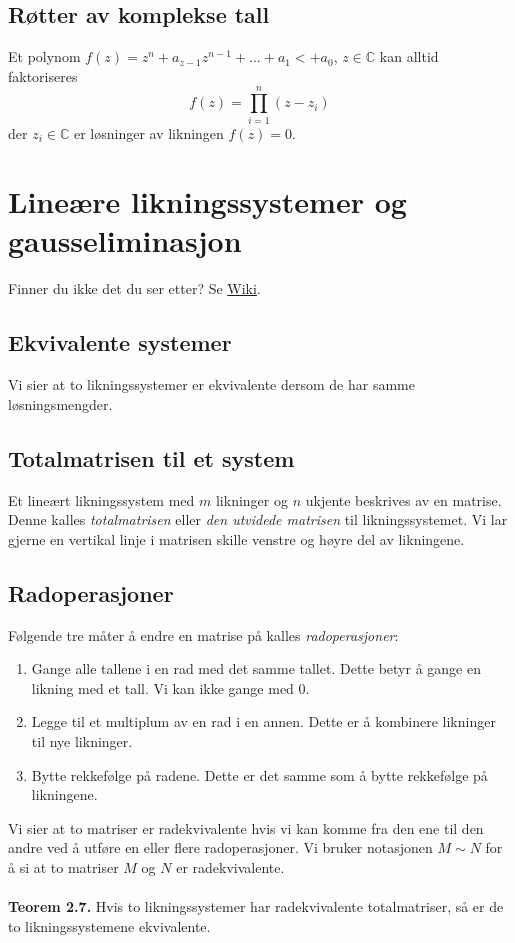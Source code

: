 \documentclass{article}
\begin{document}
\subsection{Røtter av komplekse tall}
Et polynom $f(z) = z^n + a_{z-1}z^{n-1} + ... + a_1<+a_0$, $z \in \mathbb{C}$ kan alltid faktoriseres
\[f(z) = \prod_{i=1}^n (z - z_i)\]
der $z_i \in \mathbb{C}$ er løsninger av likningen $f(z) = 0$.




\clearpage
\section{Lineære likningssystemer og gausseliminasjon}
Finner du ikke det du ser etter? Se \href{https://www.math.ntnu.no/emner/TMA4110/2020h/notater/2-lineare-likningssystemer.pdf}{Wiki}.


\subsection{Ekvivalente systemer}
Vi sier at to likningssystemer er ekvivalente dersom
de har samme løsningsmengder.


\subsection{Totalmatrisen til et system}
Et lineært likningssystem med $m$ likninger og $n$ ukjente beskrives av en matrise. Denne kalles \textit{totalmatrisen} eller \textit{den utvidede matrisen} til likningssystemet. Vi lar gjerne en vertikal linje i matrisen skille venstre og høyre del av likningene.


\subsection{Radoperasjoner}
Følgende tre måter å endre en matrise på kalles \textit{radoperasjoner}:
\begin{enumerate}
    \item Gange alle tallene i en rad med det samme tallet. Dette betyr å gange en likning med et tall. Vi kan ikke gange med 0.
    \item Legge til et multiplum av en rad i en annen. Dette er å kombinere likninger til nye likninger.
    \item Bytte rekkefølge på radene. Dette er det samme som å bytte rekkefølge på likningene.
\end{enumerate}
Vi sier at to matriser er radekvivalente hvis vi kan komme fra den ene til den andre ved å utføre en eller flere radoperasjoner. Vi bruker notasjonen $M \sim N$ for å si at to matriser $M$ og $N$ er radekvivalente.
\\\\
\textbf{Teorem 2.7.} Hvis to likningssystemer har radekvivalente totalmatriser, så er de to likningssystemene ekvivalente.
\end{document}
